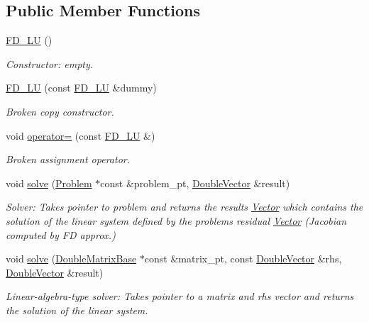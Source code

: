 \subsection*{Public Member Functions}
\begin{DoxyCompactItemize}
\item 
\hyperlink{classoomph_1_1FD__LU_a146eb52770fe0c6c2f828bb55c9be862}{F\+D\+\_\+\+LU} ()
\begin{DoxyCompactList}\small\item\em Constructor\+: empty. \end{DoxyCompactList}\item 
\hyperlink{classoomph_1_1FD__LU_ad45be3df2a071c29cef9a9555bbd28f8}{F\+D\+\_\+\+LU} (const \hyperlink{classoomph_1_1FD__LU}{F\+D\+\_\+\+LU} \&dummy)
\begin{DoxyCompactList}\small\item\em Broken copy constructor. \end{DoxyCompactList}\item 
void \hyperlink{classoomph_1_1FD__LU_a972f0332d47cf89719ab28f3feeb36d5}{operator=} (const \hyperlink{classoomph_1_1FD__LU}{F\+D\+\_\+\+LU} \&)
\begin{DoxyCompactList}\small\item\em Broken assignment operator. \end{DoxyCompactList}\item 
void \hyperlink{classoomph_1_1FD__LU_a6fd251bef9cdb7efbed4927f005eda2f}{solve} (\hyperlink{classoomph_1_1Problem}{Problem} $\ast$const \&problem\+\_\+pt, \hyperlink{classoomph_1_1DoubleVector}{Double\+Vector} \&result)
\begin{DoxyCompactList}\small\item\em Solver\+: Takes pointer to problem and returns the results \hyperlink{classoomph_1_1Vector}{Vector} which contains the solution of the linear system defined by the problem\textquotesingle{}s residual \hyperlink{classoomph_1_1Vector}{Vector} (Jacobian computed by FD approx.) \end{DoxyCompactList}\item 
void \hyperlink{classoomph_1_1FD__LU_ab8c9d6006352d0ea61a721b9c58cd523}{solve} (\hyperlink{classoomph_1_1DoubleMatrixBase}{Double\+Matrix\+Base} $\ast$const \&matrix\+\_\+pt, const \hyperlink{classoomph_1_1DoubleVector}{Double\+Vector} \&rhs, \hyperlink{classoomph_1_1DoubleVector}{Double\+Vector} \&result)
\begin{DoxyCompactList}\small\item\em Linear-\/algebra-\/type solver\+: Takes pointer to a matrix and rhs vector and returns the solution of the linear system. \end{DoxyCompactList}\item 

\end{DoxyCompactItemize}
